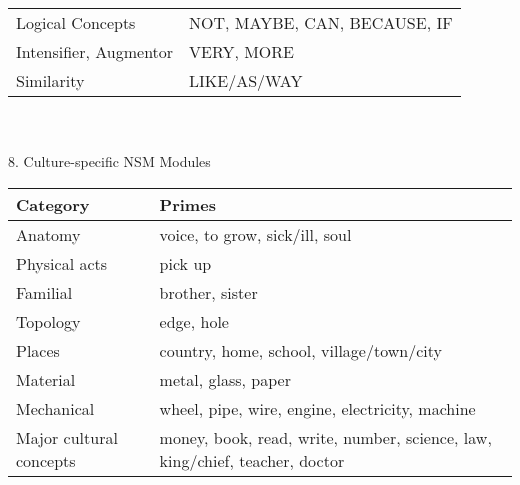 \documentclass[12pt, landscape]{article}
\begin{document}
\begin{center}
\begin{tabular}{|l|l|}
Logical Concepts& 
	

NOT, MAYBE, CAN, BECAUSE, IF\\ 

Intensifier, Augmentor& 
	

VERY, MORE\\ 

Similarity& 
	

LIKE/AS/WAY\\ 
\hline

\end{tabular}
\phantom{.}\\
\phantom{.}\\

{\Large 8. Culture-specific NSM Modules}
\begin{tabular}{|p{0.162\pagewidth}|p{0.615\pagewidth}|}
\hline
\textbf{Category}& 
\textbf{Primes}\\ 
\hline
Anatomy& 
	

voice, to grow, sick/ill, soul\\ 

Physical acts& 
	

pick up\\ 

Familial& 
	

brother, sister\\ 

Topology& 
	

edge, hole\\ 

Places& 
	

country, home, school, village/town/city\\ 

Material& 
	

metal, glass, paper\\ 

Mechanical& 
	

wheel, pipe, wire, engine, electricity, machine\\ 

Major cultural concepts& 
	

money, book, read, write, number, science, law, king/chief, teacher, doctor\\ 

\hline
\end{tabular}
\end{center}

\pagebreak
{}
\thispagestyle{empty}
\end{document}

